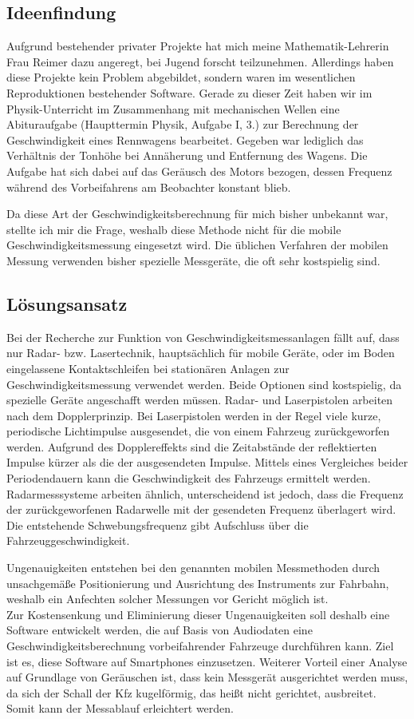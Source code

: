 \subsection{Ideenfindung}
Aufgrund bestehender privater Projekte hat mich meine Mathematik-Lehrerin Frau Reimer dazu angeregt, bei Jugend forscht teilzunehmen. Allerdings haben diese Projekte kein Problem abgebildet, sondern waren im wesentlichen Reproduktionen bestehender Software. Gerade zu dieser Zeit haben wir im Physik-Unterricht im Zusammenhang mit mechanischen Wellen eine Abituraufgabe (Haupttermin Physik, Aufgabe I, 3.) zur Berechnung der Geschwindigkeit eines Rennwagens bearbeitet. Gegeben war lediglich das Verhältnis der Tonhöhe bei Annäherung und Entfernung des Wagens. Die Aufgabe hat sich dabei auf das Geräusch des Motors bezogen, dessen Frequenz während des Vorbeifahrens am Beobachter konstant blieb.

Da diese Art der Geschwindigkeitsberechnung für mich bisher unbekannt war, stellte ich mir die Frage, weshalb diese Methode nicht für die mobile Geschwindigkeitsmessung eingesetzt wird. Die üblichen Verfahren der mobilen Messung verwenden bisher spezielle Messgeräte, die oft sehr kostspielig sind. \cite{BushnellRadarGun}

\subsection{Lösungsansatz}
Bei der Recherche zur Funktion von Geschwindigkeitsmessanlagen fällt auf, dass nur Radar- bzw. Lasertechnik, hauptsächlich für mobile Geräte, oder im Boden eingelassene Kontaktschleifen bei stationären Anlagen zur Geschwindigkeitsmessung verwendet werden. Beide Optionen sind kostspielig, da spezielle Geräte angeschafft werden müssen. Radar- und Laserpistolen arbeiten nach dem Dopplerprinzip. Bei Laserpistolen werden in der Regel viele kurze, periodische Lichtimpulse ausgesendet, die von einem Fahrzeug zurückgeworfen werden. Aufgrund des Dopplereffekts sind die Zeitabstände der reflektierten Impulse kürzer als die der ausgesendeten Impulse. Mittels eines Vergleiches beider Periodendauern kann die Geschwindigkeit des Fahrzeugs ermittelt werden. Radarmesssysteme arbeiten ähnlich, unterscheidend ist jedoch, dass die Frequenz der zurückgeworfenen Radarwelle mit der gesendeten Frequenz überlagert wird. Die entstehende Schwebungsfrequenz gibt Aufschluss über die Fahrzeuggeschwindigkeit.

Ungenauigkeiten entstehen bei den genannten mobilen Messmethoden durch unsachgemäße Positionierung und Ausrichtung des Instruments zur Fahrbahn, weshalb ein Anfechten solcher Messungen vor Gericht möglich ist. \cite{AnfechtenMobileMessmethoden}\\

Zur Kostensenkung und Eliminierung dieser Ungenauigkeiten soll deshalb eine Software entwickelt werden, die auf Basis von Audiodaten eine Geschwindigkeitsberechnung vorbeifahrender Fahrzeuge durchführen kann. Ziel ist es, diese Software auf Smartphones einzusetzen. Weiterer Vorteil einer Analyse auf Grundlage von Geräuschen ist, dass kein Messgerät ausgerichtet werden muss, da sich der Schall der Kfz kugelförmig, das heißt nicht gerichtet, ausbreitet. Somit kann der Messablauf erleichtert werden.